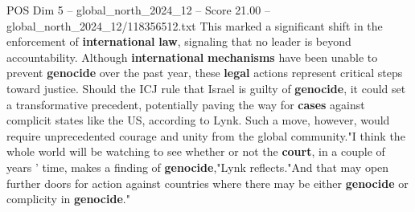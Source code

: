 \begin{textsample}{POS Dim 5 – global\_north\_2024\_12 – Score 21.00 – global\_north\_2024\_12/118356512.txt}
This marked a significant shift in the enforcement of \textbf{international} \textbf{law}, signaling that no leader is beyond accountability.
Although \textbf{international} \textbf{mechanisms} have been unable to prevent \textbf{genocide} over the past year, these \textbf{legal} actions represent critical steps toward justice.
Should the ICJ rule that Israel is guilty of \textbf{genocide}, it could set a transformative precedent, potentially paving the way for \textbf{cases} against complicit states like the US, according to Lynk.
Such a move, however, would require unprecedented courage and unity from the global community."I think the whole world will be watching to see whether or not the \textbf{court}, in a couple of years ' time, makes a finding of \textbf{genocide},"Lynk reflects."And that may open further doors for action against countries where there may be either \textbf{genocide} or complicity in \textbf{genocide}."

\end{textsample}
